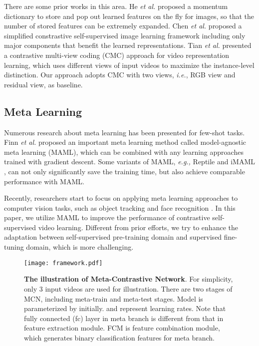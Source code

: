 \documentclass[10pt,twocolumn,letterpaper]{article}
\begin{document}
There are some prior works in this area. He \textit{et al.} \cite{he2020momentum} proposed a momentum dictionary to store and pop out learned features on the fly for images, so that the number of stored features can be extremely expanded. Chen \textit{et al.} \cite{chen2020simple} proposed a simplified constrastive self-supervised image learning framework including only major components that benefit the learned representations. Tian \textit{et al.} \cite{tian2019contrastive} presented a contrastive multi-view coding (CMC) approach for video representation learning, which uses different views of input videos to maximize the instance-level distinction. Our approach adopts CMC with two views, \textit{i.e.}, RGB view and residual view, as baseline.

\subsection{Meta Learning}
Numerous research about meta learning has been presented for few-shot tasks. Finn \textit{et al.} \cite{finn2017model} proposed an important meta learning method called model-agnostic meta learning (MAML), which can be combined with any learning approaches trained with gradient descent. Some variants of MAML, \textit{e.g.,} Reptile \cite{nichol2018first} and iMAML \cite{rajeswaran2019meta}, can not only significantly save the training time, but also achieve comparable performance with MAML.

Recently, researchers start to focus on applying meta learning approaches to computer vision tasks, such as object tracking and face recognition \cite{guo2020learning, wang2020tracking, wang2019meta}. In this paper, we utilize MAML to improve the performance of contrastive self-supervised video learning. Different from prior efforts, we try to enhance the adaptation between self-supervised pre-training domain and supervised fine-tuning domain, which is more challenging.  

\begin{figure*}
\begin{center}
\texttt{[image: framework.pdf]}
\end{center}
   \caption{\textbf{The illustration of Meta-Contrastive Network}. For simplicity, only 3 input videos are used for illustration. There are two stages of MCN, including meta-train and meta-test stages. Model is parameterized by  initially.  and  represent learning rates. Note that fully connected (fc) layer in meta branch is different from that in feature extraction module. FCM is feature combination module, which generates binary classification features for meta branch.} 
\label{fig:framwork}
\end{figure*}
\end{document}
